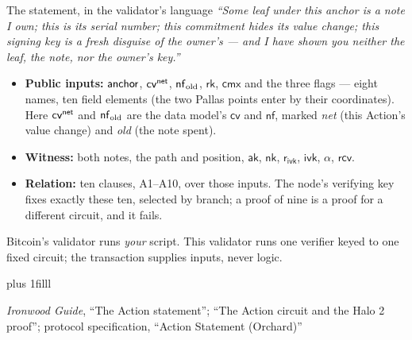 \documentclass[aspectratio=169,11pt]{beamer}
\newcommand{\nfsym}{\ensuremath{\mathsf{nf}}}
\newcommand{\cmx}{\ensuremath{\mathsf{cmx}}}
\newcommand{\cvsym}{\ensuremath{\mathsf{cv}}}
\newcommand{\rksym}{\ensuremath{\mathsf{rk}}}
\newcommand{\aksym}{\ensuremath{\mathsf{ak}}}
\newcommand{\nksym}{\ensuremath{\mathsf{nk}}}
\newcommand{\ivk}{\ensuremath{\mathsf{ivk}}}
\newcommand{\rcv}{\ensuremath{\mathsf{rcv}}}
\newcommand{\rivk}{\ensuremath{\mathsf{r_{ivk}}}}
\newcommand{\src}[1]{\par\vskip0pt plus 1filll
  {\fontsize{6}{7.2}\selectfont\color{arbdim}\raggedright #1\par}}
\begin{document}
\begin{frame}{The statement, in the validator's language}
\emph{``Some leaf under this anchor is a note I own; this is its serial
number; this commitment hides its value change; this signing key is a
fresh disguise of the owner's --- and I have shown you neither the leaf,
the note, nor the owner's key.''}
\medskip
\begin{itemize}
  \item \textbf{Public inputs:} $\mathsf{anchor}$, $\Ecv$, $\Enf$, $\rksym$,
    $\cmx$ and the three flags --- eight names, ten field elements
    (the two Pallas points enter by their coordinates). Here $\Ecv$ and
    $\Enf$ are the data model's $\cvsym$ and $\nfsym$, marked \emph{net}
    (this Action's value change) and \emph{old} (the note spent).
  \item \textbf{Witness:} both notes, the path and position, $\aksym$,
    $\nksym$, $\rivk$, $\ivk$, $\alpha$, $\rcv$.
  \item \textbf{Relation:} ten clauses, A1--A10, over those inputs.
    The node's verifying key fixes exactly these ten, selected by
    branch; a proof of nine is a proof for a different circuit, and
    it fails.
\end{itemize}
\medskip
\small Bitcoin's validator runs \emph{your} script. This validator runs
one verifier keyed to one fixed circuit; the transaction supplies
inputs, never logic.
\src{\emph{Ironwood Guide}, ``The Action statement''; ``The Action circuit and
the Halo 2 proof''; protocol specification, ``Action Statement (Orchard)''}
\end{frame}
\end{document}
